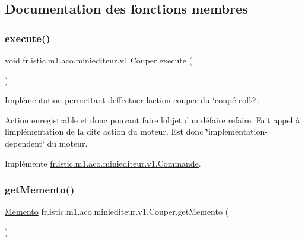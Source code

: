\subsection{Documentation des fonctions membres}
\mbox{\label{classfr_1_1istic_1_1m1_1_1aco_1_1miniediteur_1_1v1_1_1Couper_aa646ea059793eb7db2066175369cbdae}} 
\subsubsection{\texorpdfstring{execute()}{execute()}}
{\footnotesize\ttfamily void fr.\+istic.\+m1.\+aco.\+miniediteur.\+v1.\+Couper.\+execute (\begin{DoxyParamCaption}{ }\end{DoxyParamCaption})}



Implémentation permettant d\textquotesingle{}effectuer l\textquotesingle{}action couper du \char`\"{}coupé-\/collé\char`\"{}. 

Action enregistrable et donc pouvant faire l\textquotesingle{}objet d\textquotesingle{}un défaire refaire. Fait appel à l\textquotesingle{}implémentation de la dite action du moteur. Est donc \char`\"{}implementation-\/dependent\char`\"{} du moteur. 

Implémente \hyperlink{interfacefr_1_1istic_1_1m1_1_1aco_1_1miniediteur_1_1v1_1_1Commande_a87a8a55bac4e81e32339248f79f7de4f}{fr.\+istic.\+m1.\+aco.\+miniediteur.\+v1.\+Commande}.

\mbox{\label{classfr_1_1istic_1_1m1_1_1aco_1_1miniediteur_1_1v1_1_1Couper_aa4f63cd2eb49ae3b96f175989d93c338}} 
\subsubsection{\texorpdfstring{get\+Memento()}{getMemento()}}
{\footnotesize\ttfamily \hyperlink{interfacefr_1_1istic_1_1m1_1_1aco_1_1miniediteur_1_1v1_1_1Memento}{Memento} fr.\+istic.\+m1.\+aco.\+miniediteur.\+v1.\+Couper.\+get\+Memento (\begin{DoxyParamCaption}{ }\end{DoxyParamCaption})}



